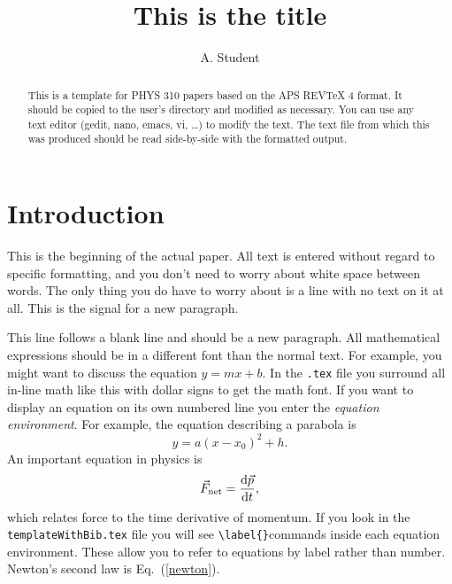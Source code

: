 \documentclass[aps,preprint,groupedaddress,letterpaper]{revtex4-1}
\begin{document}
\title{This is the title}

\author{A. Student}

\begin{abstract}
This is a template for PHYS 310 papers based on the APS REVTeX 4 format.  
It should be copied to the user's directory and modified as necessary.  
You can use any text editor (gedit, nano, emacs, vi, \dots) 
to modify the text.  The text file from which this was produced should be 
read side-by-side with the formatted output.
\end{abstract}

\maketitle

\section{Introduction}
This is the beginning of the actual paper.  All text is entered 
without regard to specific formatting, 
and you  
don't need to worry      about white space    between 
words.  The only thing you do have to worry about is a line 
with no text on it at all.   This is the signal for a new 
paragraph.


This line follows a blank line and should be a new paragraph.  All 
mathematical expressions should be in a different font than the
normal text.  For example, you might want to discuss the equation 
$y=mx +b$.  In the \verb+.tex+ file
you surround all in-line math like this with dollar signs to get 
the math font.    
If you want to display an equation on its own numbered line you enter
the \textit{equation environment}.  For example, the equation describing
a parabola is 
\begin{equation}
y = a(x-x_0)^2 + h.
\label{parabola}
\end{equation}
An important equation in physics is
\begin{equation}
\vec{F}_{\rm net}=\frac{{\rm d}\vec{p}}{{\rm d}t},
\label{newton}
\end{equation}
which relates force to the time derivative of momentum.  If you 
look in the \verb+templateWithBib.tex+ file you will see \verb+\label{}+commands
inside each equation environment.  These allow you to refer 
to equations by label rather than number.  Newton's 
second law is Eq.~(\ref{newton}).  
\end{document}
